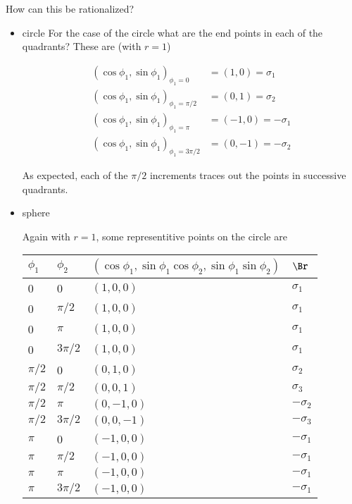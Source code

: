 \documentclass{article}
\begin{document}
How can this be rationalized?

\begin{itemize}
\item circle
For the case of the circle what are the end points in each of the quadrants?  These are (with $r=1$)

\begin{align*}
(\cos\phi_1, \sin\phi_1)_{\phi_1 = 0}        &= ( 1, 0 ) = \sigma_1 \\
(\cos\phi_1, \sin\phi_1)_{\phi_1 = \pi/2}    &= ( 0, 1 ) = \sigma_2 \\
(\cos\phi_1, \sin\phi_1)_{\phi_1 = \pi}      &= ( -1, 0 ) = -\sigma_1 \\
(\cos\phi_1, \sin\phi_1)_{\phi_1 = 3\pi/2}   &= ( 0, -1 ) = -\sigma_2
\end{align*}

As expected, each of the $\pi/2$ increments traces out the points in successive quadrants.

\item sphere

Again with $r=1$, some representitive points on the circle are

\begin{tabular}{|l|l|l|l|}
\hline
$\phi_1$ & $\phi_2$ & $(\cos\phi_1, \sin\phi_1 \cos\phi_2, \sin\phi_1 \sin\phi_2)$ & $\Br$ \\
\hline
0 & 0 & $(1,0,0)$ & $\sigma_1$ \\
0 & $\pi/2$ &  $(1,0,0)$ & $\sigma_1$ \\
0 & $\pi$ &  $(1,0,0)$ & $\sigma_1$ \\
0 & $3\pi/2$ &  $(1,0,0)$ & $\sigma_1$ \\
%
%
%
$\pi/2$ & 0 &  $(0,1,0)$ & $\sigma_2$ \\
$\pi/2$ & $\pi/2$ &  $(0,0,1)$ & $\sigma_3$ \\
$\pi/2$ & $\pi$ &  $(0,-1,0)$ & $-\sigma_2$ \\
$\pi/2$ & $3\pi/2$ &  $(0,0,-1)$ & $-\sigma_3$ \\
%
%
%
$\pi$ & 0 &  $(-1,0,0)$ & $-\sigma_1$ \\
$\pi$ & $\pi/2$ &  $(-1,0,0)$ & $-\sigma_1$ \\
$\pi$ & $\pi$ &  $(-1,0,0)$ & $-\sigma_1$ \\
$\pi$ & $3\pi/2$ & $(-1,0,0)$ & $-\sigma_1$ \\
\hline
\end{tabular}


\end{itemize}
\end{document}
